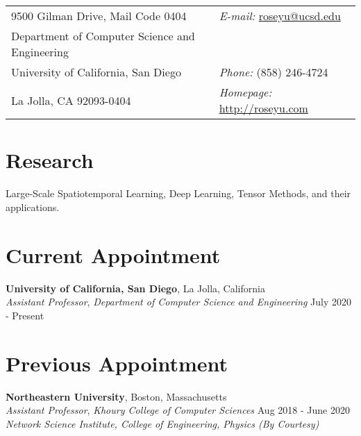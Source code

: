 \documentclass[margin,line]{res}
\newenvironment{list1}{
  \begin{list}{\ding{113}}{%
      \setlength{\itemsep}{0in}
      \setlength{\parsep}{0in} \setlength{\parskip}{0in}
      \setlength{\topsep}{0in} \setlength{\partopsep}{0in} 
      \setlength{\leftmargin}{0.17in}}}{\end{list}}
\begin{document}
\begin{resume}
\section{\sc }
\vspace{.05in}
\begin{tabular}{@{}p{3.5in}p{4in}}
9500 Gilman Drive, Mail Code 0404
 & {\it E-mail:}  \url{roseyu@ucsd.edu } \\   
Department of Computer Science and Engineering \\University of California, San Diego & {\it Phone:}  (858) 246-4724 \\            
La Jolla, CA 92093-0404   & {\it Homepage:} \url{http://roseyu.com} \\     
\end{tabular}


\section{\sc Research}
Large-Scale Spatiotemporal  Learning, Deep Learning, Tensor Methods, and their applications.

\section{\sc Current Appointment}


{\bf University of California, San Diego}, La Jolla, California \\
{\em Assistant Professor}, {\em Department of Computer Science and Engineering}  \hfill {July 2020 - Present }


\section{\sc Previous Appointment}

{\bf Northeastern University}, Boston, Massachusetts \\
{\em Assistant Professor}, {\em Khoury College of Computer Sciences}  \hfill {Aug 2018 - June 2020 }\\
{\em Network Science Institute, College of Engineering, Physics (By Courtesy)}



\end{resume}
\end{document}

